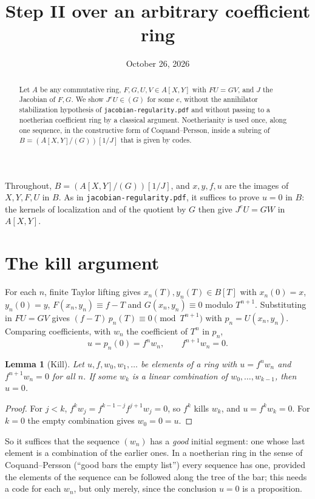\documentclass[11pt]{amsart}
\title{Step II over an arbitrary coefficient ring}
\date{October 26, 2026}
\newtheorem{lemma}[theorem]{Lemma}
\theoremstyle{definition}
\theoremstyle{remark}
\newcommand{\code}[1]{\texttt{#1}}
\begin{document}
\begin{abstract}
Let $A$ be any commutative ring, $F,G,U,V\in A[X,Y]$ with $FU=GV$, and
$J$ the Jacobian of $F,G$. We show $J^eU\in(G)$ for some $e$, without
the annihilator stabilization hypothesis of
\code{jacobian-regularity.pdf} and without passing to a noetherian
coefficient ring by a classical argument. Noetherianity is used once,
along one sequence, in the constructive form of Coquand--Persson, inside
a subring of $B=(A[X,Y]/(G))[1/J]$ that is given by codes.
\end{abstract}
\maketitle

Throughout, $B=(A[X,Y]/(G))[1/J]$, and $x,y,f,u$ are the images of
$X,Y,F,U$ in $B$. As in \code{jacobian-regularity.pdf}, it suffices to
prove $u=0$ in $B$: the kernels of localization and of the quotient by
$G$ then give $J^eU=GW$ in $A[X,Y]$.

\section{The kill argument}

For each $n$, finite Taylor lifting gives $x_n(T),y_n(T)\in B[T]$ with
$x_n(0)=x$, $y_n(0)=y$, $F(x_n,y_n)\equiv f-T$ and $G(x_n,y_n)\equiv0$
modulo $T^{n+1}$. Substituting in $FU=GV$ gives
$(f-T)\,p_n(T)\equiv0\pmod{T^{n+1}}$ with $p_n=U(x_n,y_n)$. Comparing
coefficients, with $w_n$ the coefficient of $T^n$ in $p_n$,
\[
 u=p_n(0)=f^n w_n,\qquad f^{n+1}w_n=0 .
\]

\begin{lemma}[Kill]\label{lem:kill}
Let $u,f,w_0,w_1,\ldots$ be elements of a ring with $u=f^nw_n$ and
$f^{n+1}w_n=0$ for all $n$. If some $w_k$ is a linear combination of
$w_0,\ldots,w_{k-1}$, then $u=0$.
\end{lemma}
\begin{proof}
For $j<k$, $f^kw_j=f^{k-1-j}f^{j+1}w_j=0$, so $f^k$ kills $w_k$, and
$u=f^kw_k=0$. For $k=0$ the empty combination gives $w_0=0=u$.
\end{proof}

So it suffices that the sequence $(w_n)$ has a \emph{good} initial
segment: one whose last element is a combination of the earlier ones.
In a noetherian ring in the sense of Coquand--Persson (``good bars the
empty list'') every sequence has one, provided the elements of the
sequence can be followed along the tree of the bar; this needs a code
for each $w_n$, but only merely, since the conclusion $u=0$ is a
proposition.
\end{document}
